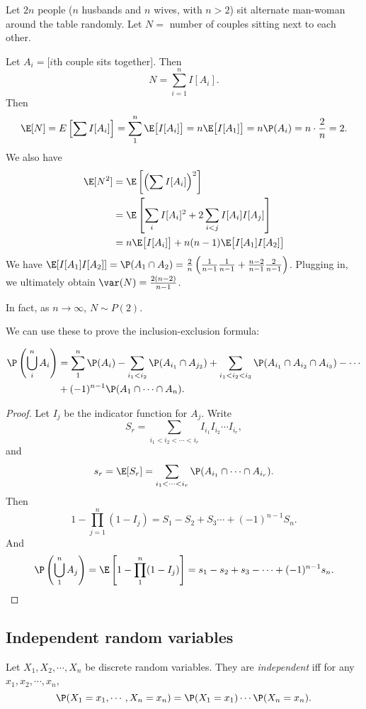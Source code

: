 \documentclass[a4paper]{article}
\begin{document}
\begin{eg}
  Let $2n$ people ($n$ husbands and $n$ wives, with $n > 2$) sit alternate man-woman around the table randomly. Let $N =$ number of couples sitting next to each other.

  Let $A_i = [i$th couple sits together$]$. Then
  \[
    N = \sum_{i = 1}^n I[A_i].
  \]
  Then 
  \[
    \E[N] = E\left[\sum I[A_i]\right] = \sum_{1}^n \E\big[I[A_i]\big] = n\E\big[I[A_1]\big] = n\P(A_i) = n\cdot \frac{2}{n} = 2.
  \]
  We also have
  \begin{align*}
    \E[N^2] &= \E\left[\left(\sum I[A_i]\right)^2\right]\\
    &= \E\left[\sum_i I[A_i]^2 + 2\sum_{i < j}I[A_i]I[A_j]\right]\\
    &= n\E\big[I[A_i]\big] + n(n - 1)\E\big[I[A_1]I[A_2]\big]
  \end{align*}
  We have $\E[I[A_1]I[A_2]] = \P(A_1\cap A_2) = \frac{2}{n}\left(\frac{1}{n - 1}\frac{1}{n - 1}  + \frac{n - 2}{n - 1}\frac{2}{n - 1}\right)$. Plugging in, we ultimately obtain $\var(N) = \frac{2(n- 2)}{n - 1}$.

  In fact, as $n\to \infty$, $N\sim P(2)$.
\end{eg}

We can use these to prove the inclusion-exclusion formula:
\begin{thm}
  \begin{align*}
    \P\left(\bigcup_i^n A_i\right) &= \sum_1^n \P(A_i) - \sum_{i_1 < i_2} \P(A_{i_1}\cap A_{j_2}) + \sum_{i_1 < i_2 < i_3}\P(A_{i_1}\cap A_{i_2} \cap A_{i_3}) - \cdots\\
    &+ (-1)^{n - 1} \P(A_1\cap \cdots \cap A_n).
  \end{align*}
\end{thm}

\begin{proof}
  Let $I_j$ be the indicator function for $A_j$. Write
  \[
    S_r = \sum_{i_1 < i_2 < \cdots < i_r}I_{i_1}I_{i_2}\cdots I_{i_r},
  \]
  and
  \[
    s_r = \E[S_r] = \sum_{i_1 < \cdots < i_r}\P(A_{i_1}\cap \cdots \cap A_{i_r}).
  \]
  Then
  \[
    1 - \prod_{j = 1}^n(1 - I_j) = S_1 - S_2 + S_3 \cdots + (-1)^{n - 1}S_n.
  \]
  And 
  \[
    \P\left(\bigcup_1^n A_j\right) = \E\left[1 - \prod_1^n(1 - I_j)\right] = s_1 - s_2 + s_3 - \cdots + (-1)^{n - 1}s_n.
  \]
\end{proof}
\subsection{Independent random variables}
\begin{defi}
  Let $X_1, X_2, \cdots, X_n$ be discrete random variables. They are \emph{independent} iff for any $x_1, x_2, \cdots, x_n$,
  \[
    \P(X_1 = x_1, \cdots, X_n = x_n) = \P(X_1 = x_1)\cdots \P(X_n = x_n).
  \]
\end{defi}
\end{document}
